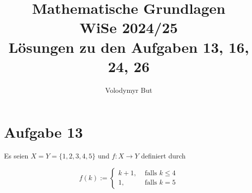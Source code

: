 \documentclass[10pt, oneside]{article}
\title{Mathematische Grundlagen\\[5pt]\Large WiSe 2024/25\\[10pt]\Large L{\"o}sungen zu den Aufgaben 13, 16, 24, 26}
\author{Volodymyr But}
\date{}
\begin{document}
\sloppy

\maketitle
\vspace{25px}

\section{Aufgabe 13}

Es seien $X = Y = \{1, 2, 3, 4 ,5\}$ und $f : X \longrightarrow Y$ definiert durch

\begin{equation*}
    f(k) :=
    \begin{cases}
        k + 1,& \text{ falls } k \leq 4 \\
        1,    & \text{ falls } k =    5
    \end{cases}
\end{equation*}
\end{document}
